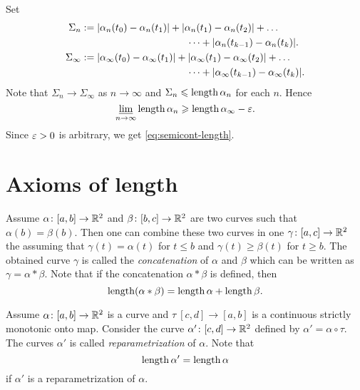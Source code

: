 Set 
\begin{align*}\Sigma_n
&\df
|\alpha_n(t_0)-\alpha_n(t_1)|+|\alpha_n(t_1)-\alpha_n(t_2)|+\dots
\\
&\ \ \ \ \ \ \ \ \ \ \ \ \ \ \ \ \ \ \ \ \ \ \ \ \ \ \ \ \ \ \ \ \dots+|\alpha_n(t_{k-1})-\alpha_n(t_k)|.
\\
\Sigma_\infty
&\df
|\alpha_\infty(t_0)-\alpha_\infty(t_1)|+|\alpha_\infty(t_1)-\alpha_\infty(t_2)|+\dots
\\
&\ \ \ \ \ \ \ \ \ \ \ \ \ \ \ \ \ \ \ \ \ \ \ \ \ \ \ \ \ \ \ \ \dots+|\alpha_\infty(t_{k-1})-\alpha_\infty(t_k)|.
\end{align*}
Note that $\Sigma_n\to \Sigma_\infty$ as $n\to\infty$
and $\Sigma_n\leqslant\mathop{\rm length}\nolimits\alpha_n$ for each $n$.
Hence
$$\varliminf_{n\to\infty} \mathop{\rm length}\nolimits\alpha_n \geqslant \mathop{\rm length}\nolimits\alpha_\infty-\varepsilon.$$
Since $\varepsilon>0$ is arbitrary, we get \ref{eq:semicont-length}.\qeds

\section{Axioms of length}

Assume $\alpha\colon[a,b]\to \mathbb{R}^2$ and $\beta\:[b,c]\z\to \RR^2$ are two curves such that $\alpha(b)=\beta(b)$.
Then one can combine these two curves in one $\gamma\:[a,c]\z\to \RR^2$ the assuming that $\gamma(t)=\alpha(t)$ for $t\le b$ and $\gamma(t)\ge\beta(t)$ for $t\ge b$.
The obtained curve $\gamma$ is called the 
\emph{concatenation} of $\alpha$ and $\beta$ which can be written as $\gamma=\alpha*\beta$.
Note that if the concatenation $\alpha*\beta$ is defined, then
\[\mathop{\rm length}\nolimits(\alpha*\beta)=\mathop{\rm length}\nolimits\alpha+\mathop{\rm length}\nolimits\beta.\]

Assume $\alpha\colon[a,b]\to \mathbb{R}^2$ is a curve and $\tau\:[c,d]\to [a,b]$ is a continuous strictly monotonic onto map.
Consider the curve $\alpha'\colon[c,d]\to \mathbb{R}^2$ defined by $\alpha'=\alpha\circ\tau$.
The curves $\alpha'$ is called \emph{reparametrization} of $\alpha$.
Note that 
\[\mathop{\rm length}\nolimits\alpha'=\mathop{\rm length}\nolimits\alpha\]
if $\alpha'$ is a reparametrization of $\alpha$.




